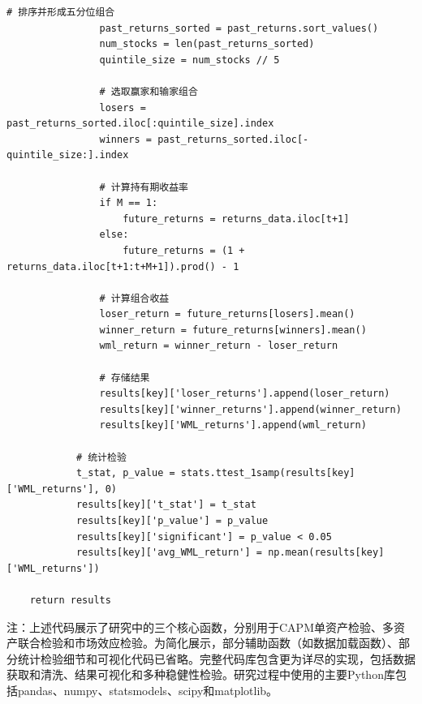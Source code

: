 \documentclass[12pt, a4paper]{article}
\begin{document}
\begin{lstlisting}[basicstyle=\small\ttfamily, breaklines=true, columns=fullflexible]
                # 排序并形成五分位组合
                past_returns_sorted = past_returns.sort_values()
                num_stocks = len(past_returns_sorted)
                quintile_size = num_stocks // 5
                
                # 选取赢家和输家组合
                losers = past_returns_sorted.iloc[:quintile_size].index
                winners = past_returns_sorted.iloc[-quintile_size:].index
                
                # 计算持有期收益率
                if M == 1:
                    future_returns = returns_data.iloc[t+1]
                else:
                    future_returns = (1 + returns_data.iloc[t+1:t+M+1]).prod() - 1
                
                # 计算组合收益
                loser_return = future_returns[losers].mean()
                winner_return = future_returns[winners].mean()
                wml_return = winner_return - loser_return
                
                # 存储结果
                results[key]['loser_returns'].append(loser_return)
                results[key]['winner_returns'].append(winner_return)
                results[key]['WML_returns'].append(wml_return)
            
            # 统计检验
            t_stat, p_value = stats.ttest_1samp(results[key]['WML_returns'], 0)
            results[key]['t_stat'] = t_stat
            results[key]['p_value'] = p_value
            results[key]['significant'] = p_value < 0.05
            results[key]['avg_WML_return'] = np.mean(results[key]['WML_returns'])
    
    return results
\end{lstlisting}

注：上述代码展示了研究中的三个核心函数，分别用于CAPM单资产检验、多资产联合检验和市场效应检验。为简化展示，部分辅助函数（如数据加载函数）、部分统计检验细节和可视化代码已省略。完整代码库包含更为详尽的实现，包括数据获取和清洗、结果可视化和多种稳健性检验。研究过程中使用的主要Python库包括pandas、numpy、statsmodels、scipy和matplotlib。
\end{document}
